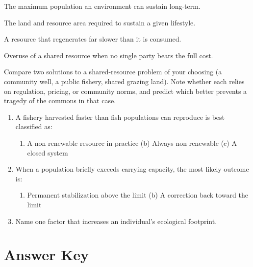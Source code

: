 \documentclass[11pt,a4paper]{scrreprt}
\begin{document}
\begin{termsbox}
\begin{description}[leftmargin=3.6cm,itemsep=1pt,topsep=1pt]
  \item[Carrying capacity] The maximum population an environment can sustain long-term.
  \item[Ecological footprint] The land and resource area required to sustain a given lifestyle.
  \item[Non-renewable resource] A resource that regenerates far slower than it is consumed.
  \item[Tragedy of the commons] Overuse of a shared resource when no single party bears the full cost.
\end{description}
\end{termsbox}

\begin{activitybox}
Compare two solutions to a shared-resource problem of your choosing (a community well, a public
fishery, shared grazing land). Note whether each relies on regulation, pricing, or community
norms, and predict which better prevents a tragedy of the commons in that case.
\end{activitybox}

\begin{quizbox}
\begin{enumerate}[label=\arabic*.]
  \item A fishery harvested faster than fish populations can reproduce is best classified as:
  \begin{enumerate}[label=(\alph*)]
    \item A non-renewable resource in practice \quad (b) Always non-renewable \quad (c) A closed system
  \end{enumerate}
  \item When a population briefly exceeds carrying capacity, the most likely outcome is:
  \begin{enumerate}[label=(\alph*)]
    \item Permanent stabilization above the limit \quad (b) A correction back toward the limit
  \end{enumerate}
  \item Name one factor that increases an individual's ecological footprint.
\end{enumerate}
\end{quizbox}

\chapter*{Answer Key}
\end{document}
